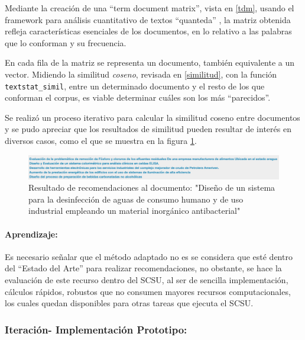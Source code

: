 \documentclass[
  12pt,
  openany]{book}
\begin{document}
Mediante la creación de una ``term document matrix'', vista en \ref{tdm}, usando el framework para análisis cuantitativo de textos ``quanteda'' \citep{quanteda}, la matriz obtenida refleja características esenciales de los documentos, en lo relativo a las palabras que lo conforman y su frecuencia.

En cada fila de la matriz se representa un documento, también equivalente a un vector. Midiendo la similitud \emph{coseno}, revisada en \ref{similitud}, con la función \texttt{textstat\_simil}, entre un determinado documento y el resto de los que conforman el corpus, es viable determinar cuáles son los más ``parecidos''.

Se realizó un proceso iterativo para calcular la similitud coseno entre documentos y se pudo apreciar que los resultados de similitud pueden resultar de interés en diversos casos, como el que se muestra en la figura \ref{fig:similitudreco}.

\begin{figure}

{\centering \includegraphics[width=0.9\linewidth]{images/05-desarrollo/2_ciclo/similitud_reco2} 

}

\caption{Resultado de recomendaciones al documento: "Diseño de un sistema para la desinfección de aguas de consumo humano y de uso industrial empleando un material inorgánico antibacterial"}\label{fig:similitudreco}
\end{figure}

\hypertarget{aprendizaje-1}{%
\paragraph{Aprendizaje:}\label{aprendizaje-1}}

Es necesario señalar que el método adaptado no es se considera que esté dentro del ``Estado del Arte'' para realizar recomendaciones, no obstante, se hace la evaluación de este recurso dentro del SCSU, al ser de sencilla implementación, cálculos rápidos, robustos que no consumen mayores recursos computacionales, los cuales quedan disponibles para otras tareas que ejecuta el SCSU.

\hypertarget{iterbol}{%
\subsubsection{Iteración- Implementación Prototipo:}\label{iterbol}}
\end{document}

